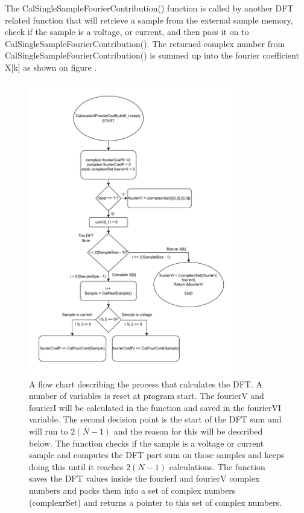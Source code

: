 The CalSingleSampleFourierContribution() function is called by another DFT related function that will retrieve a sample from the external sample memory, check if the sample is a voltage, or current, and then pass it on to CalSingleSampleFourierContribution(). The returned complex number from CalSingleSampleFourierContribution() is summed up into the fourier coefficient X[k] as shown on figure .
\begin{figure}[H]
    \centering
    \includegraphics[clip, trim=0 0 0 0, width=0.8\textwidth]{Sections/7_SystemDesign/Figures/7_3_2_DFTFunction.pdf}
    \caption{A flow chart describing the process that calculates the DFT. A number of variables is reset at program start. The fourierV and fourierI will be calculated in the function and saved in the fourierVI variable. The second decision point is the start of the DFT sum and will run to $2(N-1)$ and the reason for this will be described below. The function checks if the sample is a voltage or current sample and computes the DFT part sum on those samples and keeps doing this until it reaches $2(N-1)$ calculations. The function saves the DFT values inside the fourierI and fourierV complex numbers and packs them into a set of complex numbers (complexrSet) and returns a pointer to this set of complex numbers.}
    \label{fig:7_3_2_DFT1}
\end{figure}

